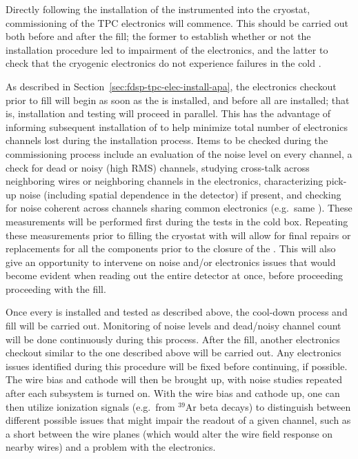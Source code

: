 Directly following the installation of the instrumented  into the cryostat, commissioning of the
TPC electronics will commence.  This should be carried out both before and after the \lar fill;
the former to establish whether or not the installation procedure led to impairment of the
electronics, and the latter to check that the cryogenic electronics do not experience failures
in the cold \lar.

As described in Section~\ref{sec:fdsp-tpc-elec-install-apa}, the electronics checkout prior to
\lar fill will begin as soon as the  is installed, and before all  are installed; that is,
installation and testing will proceed in parallel.  This has the advantage of informing
subsequent installation of  to help minimize total number of electronics channels lost
during the installation process.  Items to be checked during the commissioning process include
an evaluation of the noise level on every channel, a check for dead or noisy (high RMS) channels,
studying cross-talk across neighboring wires or neighboring channels in the electronics,
characterizing pick-up noise (including spatial dependence in the detector) if present, and
checking for noise coherent across channels sharing common electronics (e.g.~same ).
These measurements will be performed first during the tests in the cold box.  Repeating these
measurements prior to filling the cryostat with \lar will allow for final repairs or replacements
for all the  components prior to the closure of the . This will also give an opportunity
to intervene on noise and/or electronics issues that would become evident when reading out
the entire detector at once, before proceeding proceeding with the \lar fill.

Once every  is installed and tested as described above, the cool-down process and \lar fill
will be carried out.  Monitoring of noise levels and dead/noisy channel count will be
done continuously during this process.  After the \lar fill, another electronics checkout
similar to the one described above will be carried out.  Any electronics issues identified
during this procedure will be fixed before continuing, if possible.  The wire bias  and
cathode  will then be brought up, with noise studies repeated after each subsystem is
turned on.  With the wire bias  and cathode  up, one can then utilize ionization signals
(e.g.~from $\mathrm{{}^{39}Ar}$ beta decays) to distinguish between different possible issues
that might impair the readout of a given channel, such as a short between the wire planes
(which would alter the wire field response on nearby wires) and a problem with the electronics.

